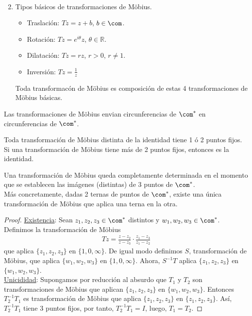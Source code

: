 \begin{enumerate}
\begin{align*}
    \end{align*}
    \item Tipos básicos de transformaciones de M\"obius.
    \begin{itemize}
        \item Traslación: $Tz = z + b$, $b \in \com$.
        \item Rotación: $Tz = e^{i\theta}z$, $\theta \in \mathbb{R}$.
        \item Dilatación: $Tz = rz$, $r > 0$, $r \not = 1$.
        \item Inversión: $Tz = \frac{1}{z}$
    \end{itemize}
    Toda transformacón de M\"obius es composición de estas 4 transformaciones de M\"obius básicas.
\end{enumerate}

\begin{prop}
Las transformaciones de M\"obius envian circunferencias de $\com^*$ en circunferencias de $\com^*$.
\end{prop}

\begin{prop}
Toda transformación de M\"obius distinta de la identidad tiene 1 ó 2 puntos fijos. Si una transformación de M\"obius tiene más de 2 puntos fijos, entonces es la identidad.
\end{prop}

\begin{teo}
Una transformación de M\"obius queda completamente determinada en el momento que se establecen las imágenes (distintas) de 3 puntos de $\com^*$.
\newline
\\
Más concretamente, dadas 2 ternas de puntos de $\com^*$, existe una única transformación de M\"obius que aplica una terna en la otra.
\end{teo}

\begin{proof}
\underline{Existencia}:
Sean $z_1,z_2,z_3 \in \com^*$ distintos y $w_1,w_2,w_3 \in \com^*$. Definimos la transformación de M\"obius
\begin{align*}
    Tz = \frac{z - z_2}{z - z_3} \cdot \frac{z_1 - z_3}{z_1 - z_2}
\end{align*}
que aplica $\{z_1,z_2,z_3\}$ en $\{1,0,\infty\}$. De igual modo definimos $S$, transformación de M\"obius, que aplica $\{w_1,w_2,w_3\}$ en $\{1,0,\infty\}$. Ahora, $S^{-1}T$ aplica $\{z_1,z_2,z_3\}$ en $\{w_1,w_2,w_3\}$.
\\
\newline
\underline{Unicididad}: Supongamos por reducción al absurdo que $T_1$ y $T_2$ son transformaciones de M\"obius que aplican $\{z_1,z_2,z_3\}$ en $\{w_1,w_2,w_3\}$. Entonces $T_2^{-1}T_1$ es transformación de M\"obius que aplica $\{z_1,z_2,z_3\}$ en $\{z_1,z_2,z_3\}$. Así, $T_2^{-1}T_1$ tiene 3 puntos fijos, por tanto, $T_2^{-1}T_1 = I$, luego, $T_1 = T_2$.
\end{proof}

